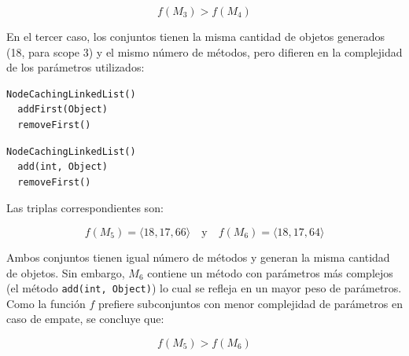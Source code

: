 \[
f(M_3) > f(M_4)
\]


En el tercer caso, los conjuntos tienen la misma cantidad de objetos generados (18, para scope 3) y el mismo número de métodos, pero difieren en la complejidad de los parámetros utilizados:

\begin{lstlisting}[numbers=none,label=fig:NCLbuilders5, caption=Conjunto de métodos \( M_5 \)]
  NodeCachingLinkedList()
  addFirst(Object)
  removeFirst()
\end{lstlisting}

\begin{lstlisting}[numbers=none,label=fig:NCLbuilders6, caption=Conjunto de métodos \( M_6 \)]
  NodeCachingLinkedList()
  add(int, Object)
  removeFirst()
\end{lstlisting}

Las triplas correspondientes son:

\[
f(M_5) = \langle 18, 17, 66 \rangle \quad \text{y} \quad f(M_6) = \langle 18, 17, 64 \rangle
\]

Ambos conjuntos tienen igual número de métodos y generan la misma cantidad de objetos. 
Sin embargo, \( M_6 \) contiene un método con parámetros más complejos (el método \texttt{add(int, Object)}) lo cual se refleja en un mayor peso de parámetros. 
Como la función \( f \) prefiere subconjuntos con menor complejidad de parámetros en caso de empate, se concluye que:

\[
f(M_5) > f(M_6)
\]







